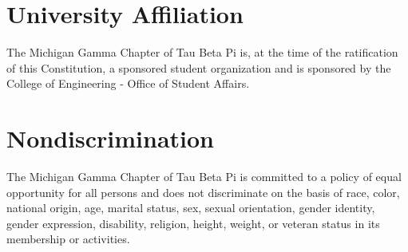\section{University Affiliation} The Michigan Gamma Chapter of Tau Beta Pi is, at the time of the ratification of this Constitution, a sponsored student organization and is sponsored by the College of Engineering - Office of Student Affairs. %

\section{Nondiscrimination}  The Michigan Gamma Chapter of Tau Beta Pi is committed to a policy of equal opportunity for all persons and does not discriminate on the basis of race, color, national origin, age, marital status, sex, sexual orientation, gender identity, gender expression, disability, religion, height, weight, or veteran status in its membership or activities.%
